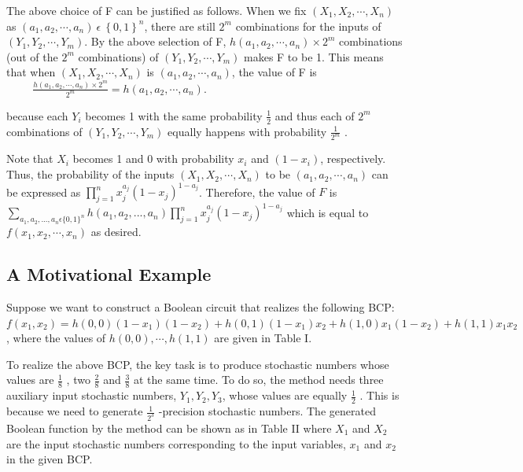 \documentclass[10pt,conference]{IEEEtran}
\begin{document}
\par
The above choice of F can be justified as follows. When
we fix $(X_1, X_2, \cdots , X_n)$ as $(a_1, a_2, \cdots , a_n) \:\epsilon\:   \left \{ 0,1 \right \}^n$, there are still $2^m$ combinations for the inputs of $(Y_1, Y_2, \cdots , Y_m)$. By the above selection of F, $h(a_1, a_2, \cdots , a_n) \times 2^m$ combinations (out of the $2^m$ combinations) of $(Y_1, Y_2, \cdots , Y_m)$ makes F to be 1. This means that when $(X_1, X_2, \cdots , X_n)$ is $(a_1, a_2, \cdots , a_n)$, the value of F is \\

\begin{math}
\hspace{1cm} \frac{h(a_1, a_2, \cdots , a_n) \times 2^m}{2^m} = h(a_1, a_2, \cdots , a_n).
\end{math}

\noindent
because each $Y_i$ becomes 1 with the same probability $\frac{1}{2}$ and thus each of $2^m$ combinations of ${(Y_1, Y_2, \cdots , Y_m)}$ equally
happens with probability $\frac{1}{2^m}$ .

\par
Note that $X_i$ becomes 1 and 0 with probability $x_i$ and
$(1 - x_i)$, respectively. Thus, the probability of the inputs
$(X_1, X_2, \cdots , X_n)$ to be $(a_1, a_2, \cdots , a_n)$ can be expressed as $\prod_{j=1}^{n}x_j^{a_j}(1-x_j)^{1-a_j}$.  Therefore, the value of $F$ is $\sum_{a_1, a_2,...,a_n\epsilon \{{0,1}\}^{n}}h(a_1, a_2,...,a_n)\prod_{j=1}^{n}x_j^{a_j}(1-x_j)^{1-a_j}$ which is equal to $f(x_1, x_2,\cdots, x_n)$ as desired.

\subsection{A Motivational Example}

Suppose we want to construct a Boolean circuit that realizes
the following BCP: $f(x_1, x_2) =h(0, 0)(1 - x_1)(1 - x_2) +
h(0, 1)(1 - x_1)x_2 + h(1, 0)x_1(1 - x_2) + h(1, 1)x_1x_2$, where
the values of $h(0, 0), \cdots , h(1, 1)$ are given in Table I.

\par
To realize the above BCP, the key task is to produce
stochastic numbers whose values are $\frac{1}
{8}$ , two $\frac{2}{8}$ and $\frac{3}{8}$ at the
same time. To do so, the method \cite{fifteen} needs three auxiliary
input stochastic numbers, $Y_1, Y_2, Y_3$, whose values are equally $\frac{1}{2}$ . This is because we need to generate $\frac{1}{2^3}$ -precision stochastic
numbers. The generated Boolean function by the method \cite{fifteen}
can be shown as in Table II where $X_1$ and $X_2$ are the input
stochastic numbers corresponding to the input variables, $x_1$
and $x_2$ in the given BCP.
\end{document}
